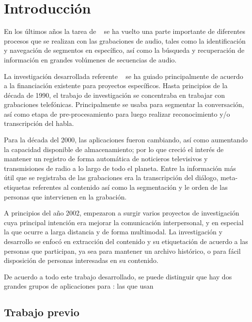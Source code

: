 
\chapter{Introducción}\label{ch:chap1}

En los últimos años la tarea de \SD~ se ha vuelto una parte importante de diferentes procesos que se realizan con las grabaciones de audio, tales como la identificación y navegación de segmentos en específico, así como la búsqueda y recuperación de información en grandes volúmenes de secuencias de audio.

La investigación desarrollada referente \sd~ se ha guiado principalmente de acuerdo a la financiación existente para proyectos específicos. Hasta principios de la década de 1990, el trabajo de investigación se concentraba en trabajar con grabaciones telefónicas. Principalmente se usaba para segmentar la conversación, así como etapa de pre-procesamiento para luego realizar reconocimiento y/o transcripción del habla.

Para la década del 2000, las aplicaciones fueron cambiando, así como aumentando la capacidad disponible de almacenamiento; por lo que creció el interés de mantener un registro de forma automática de noticieros televisivos  y transmisiones de radio a lo largo de todo el planeta. Entre la información más útil que se registraba de las grabaciones era la transcripción del diálogo, meta-etiquetas referentes al contenido así como la segmentación y le orden de las personas que intervienen en la grabación.

A principios del año 2002, empezaron a surgir varios proyectos de investigación cuya principal intención era mejorar la comunicación interpersonal, y en especial la que ocurre a larga distancia y de forma multimodal. La investigación y desarrollo se enfocó en extracción del contenido y su etiquetación de acuerdo a las personas que participan, ya sea para mantener un archivo histórico, o para fácil disposición de personas interesadas en su contenido.

De acuerdo a todo este trabajo desarrollado, se puede distinguir que hay dos grandes grupos de aplicaciones para \sd: las que usan 

\section{Trabajo previo}
\label{sec:previo}
